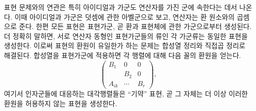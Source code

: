 \documentclass[11pt]{article}
\begin{document}
표현 문제와의 연관은 특히 아이디얼과 가군도 연산자를 가진 군에 속한다는 데서 나온다. 이때 아이디얼과 가군은 덧셈에 관한 아벨군으로 보고, 연산자는 환 원소와의 곱셈으로 준다. 한편 모든 표현은 표현가군, 곧 환과 표현체에 관한 가군으로부터 생성된다. 더 정확히 말하면, 서로 연산자 동형인 표현가군들의 류인 각 가군류는 동일한 표현을 생성한다. 이로써 표현의 환원이 유일한가 하는 문제는 합성열 정리와 직접곱 정리로 해결된다. 합성열을 표현가군에 적용하면 각 행렬에 대해 다음 꼴의 환원을 얻는다.
\[
\begin{pmatrix}
B_1&0&0\\
&B_2&0\\
A_{ik}&\cdots&B_r
\end{pmatrix},
\]
여기서 인자군들에 대응하는 대각행렬들은 ``기약'' 표현, 곧 그 자체는 더 이상 이러한 환원을 허용하지 않는 표현을 생성한다.
\end{document}
